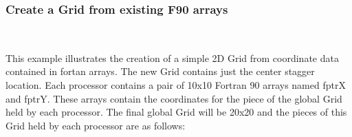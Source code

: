  
\setlength{\oldparskip}{\parskip}
\setlength{\parskip}{1.5ex}
\setlength{\oldparindent}{\parindent}
\setlength{\parindent}{0pt}
\setlength{\oldbaselineskip}{\baselineskip}
\setlength{\baselineskip}{11pt}
 
\def\bv{\begin{verbatim}}
\def\ev{\end{verbatim}}
\def\be{\begin{equation}}
\def\ee{\end{equation}}
\def\bea{\begin{eqnarray}}
\def\eea{\end{eqnarray}}
\def\bi{\begin{itemize}}
\def\ei{\end{itemize}}
\def\bn{\begin{enumerate}}
\def\en{\end{enumerate}}
\def\bd{\begin{description}}
\def\ed{\end{description}}
\def\({\left (}
\def\){\right )}
\def\[{\left [}
\def\]{\right ]}
\def\<{\left  \langle}
\def\>{\right \rangle}
\def\cI{{\cal I}}
\def\diag{\mathop{\rm diag}}
\def\tr{\mathop{\rm tr}}


 

   \subsubsection{Create a Grid from existing F90 arrays}~\label{sec:example5}
  
   This example illustrates the creation of a simple 2D Grid from coordinate data
    contained in fortan arrays.  The new Grid contains just the center stagger location.
    Each processor contains a pair of 10x10 Fortran 90 arrays named fptrX and fptrY.
    These arrays contain the coordinates for the piece of the global Grid held by each
    processor. The final global Grid will be 20x20 and the pieces of this Grid held
   by each processor are as follows:
  
